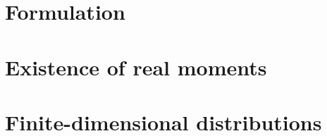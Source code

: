 \label{affine-processes:introduction}


\section{Formulation}
\label{affine-processes:formulation}


\section{Existence of real moments}
\label{affine-processes:existence}


\section{Finite-dimensional distributions}
\label{affine-processes:fdds}


